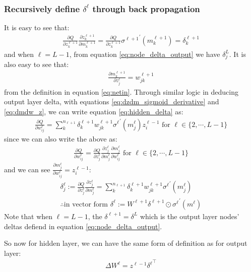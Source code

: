 \documentclass{article} [10pt] %
\begin{document}
\subsubsection{Recursively define $\delta^\ell$ through back propagation}
It is easy to see that:
\begin{align}
\frac{\partial Q}{\partial z^{\ell+1}_{k}}\frac{\partial z^{\ell+1}_{k}}{\partial m^{\ell+1}_{k}} = \frac{\partial Q}{\partial z^{\ell+1}_{k}}{\sigma^{\ell+1}}^\prime(m^{\ell+1}_{k}) = \delta^{\ell+1}_k
\end{align}
and when $\ell=L-1$, from equation \eqref{eq:node_delta_output} we have $\delta^L_j$. It is also easy to see that:
\begin{align}
	\frac{\partial m^{\ell+1}_{k}}{\partial z^\ell_j} = w^{\ell+1}_{jk}
\end{align}
from the definition in equation \eqref{eq:netin}. Through similar logic in deducing output layer delta, with equations \eqref{eq:dzdm_sigmoid_derivative}  and \eqref{eq:dmdw_z}, we can write equation \eqref{eq:hidden_delta} as:
\begin{align}
	\frac{\partial Q}{\partial w^\ell_{ij}} = \sum_k^{n_{\ell+1}}\delta^{\ell+1}_kw^{\ell+1}_{jk}
							{\sigma^{\ell}}^\prime(m^{\ell}_j)z^{\ell-1}_i
\text{ for } \ell \in \{2, \cdots, L-1\}
\end{align}
since we can also write the above as:
\begin{align}
	\frac{\partial Q}{\partial w^\ell_{ij}} =  \frac{\partial Q}{\partial z^\ell_j}\frac{\partial z^\ell_j}{\partial m^\ell_j}\frac{\partial m^\ell_j}{\partial w^\ell_{ij}}
\text{ for } \ell \in \{2, \cdots, L-1\}
\end{align}
and we can see $\frac{\partial m^\ell_j}{\partial w^\ell_{ij}}=z^{\ell-1}_i$:
\begin{align}
\boxed{
	\delta^\ell_j :=  \frac{\partial Q}{\partial z^\ell_j}\frac{\partial z^\ell_j}{\partial m^\ell_j} = \sum_k^{n_{\ell+1}}\delta^{\ell+1}_kw^{\ell+1}_{jk}{\sigma^{\ell}}^\prime(m^{\ell}_j)
} \\
\boxed{
	\therefore \text{in vector form }  \delta^\ell := W^{\ell+1}{\delta^{\ell+1}} \odot {\sigma^{\ell}}^\prime(m^{\ell})
}
\end{align}
Note that when $\ell=L-1$, the $\delta^{\ell+1}=\delta^L$ which is the output layer nodes' deltas defiend in equation \eqref{eq:node_delta_output}.

So now for hidden layer, we can have the same form of definition as for output layer:
\begin{align} \label{eq:delta_w_hidden}
\boxed{
	\Delta W^\ell = z^{\ell-1}{\delta^{\ell}}^\top
}
\end{align}
\newpage
\end{document}
